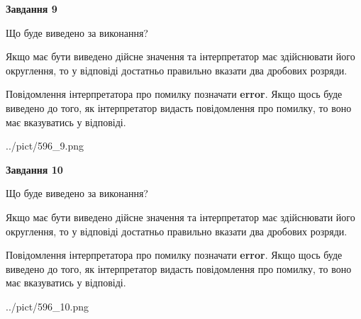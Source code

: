 \documentclass[12pt, ukrainian]{article}
\begin{document}
{\begin {Large}
{\begin {center}\textbf{Завдання 9}\end {center}}\par
Що буде виведено за виконання? \par

Якщо має бути виведено дійсне значення та інтерпретатор має здійснювати його округлення, 
то у відповіді достатньо правильно вказати два дробових розряди.

Повідомлення інтерпретатора про помилку позначати \textbf{error}.
Якщо щось буде виведено до того, як інтерпретатор видасть повідомлення про помилку, 
то воно має вказуватись у відповіді. \par

\begin{center}
	{../pict/596_9.png}
\end{center}
\newpage

{\begin {center}\textbf{Завдання 10}\end {center}}\par
Що буде виведено за виконання? \par

Якщо має бути виведено дійсне значення та інтерпретатор має здійснювати його округлення, 
то у відповіді достатньо правильно вказати два дробових розряди.

Повідомлення інтерпретатора про помилку позначати \textbf{error}.
Якщо щось буде виведено до того, як інтерпретатор видасть повідомлення про помилку, 
то воно має вказуватись у відповіді. \par

\begin{center}
	{../pict/596_10.png}
\end{center}
\newpage

\end {Large}}
\end{document}
